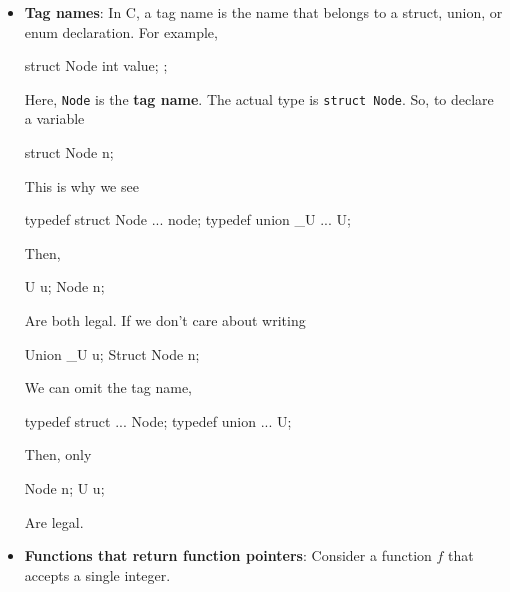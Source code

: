 \documentclass{report}
\begin{document}
    \pagebreak 
    \begin{itemize}
        \item \textbf{Tag names}: In C, a tag name is the name that belongs to a struct, union, or enum declaration. For example,
            \bigbreak \noindent 
            \begin{cppcode}
                struct Node {
                    int value;
                };
            \end{cppcode}
            \bigbreak \noindent 
            Here, \texttt{Node} is the \textbf{tag name}. The actual type is \texttt{struct Node}. So, to declare a variable
            \bigbreak \noindent 
            \begin{cppcode}
                struct Node n; 
            \end{cppcode}
            \bigbreak \noindent 
            This is why we see
            \bigbreak \noindent 
            \begin{cppcode}
                typedef struct Node {...} node;
                typedef union _U {...} U;
            \end{cppcode}
            \bigbreak \noindent 
            Then,
            \bigbreak \noindent 
            \begin{cppcode}
                U u;  
                Node n;
            \end{cppcode}
            \bigbreak \noindent 
            Are both legal. If we don't care about writing
            \bigbreak \noindent 
            \begin{cppcode}
                Union _U u;
                Struct Node n;
            \end{cppcode}
            \bigbreak \noindent 
            We can omit the tag name,
            \bigbreak \noindent 
            \begin{cppcode}
                typedef struct {...} Node;
                typedef union {...} U;
            \end{cppcode}
            \bigbreak \noindent 
            Then, only 
            \bigbreak \noindent 
            \begin{cppcode}
                Node n;
                U u;
            \end{cppcode}
            \bigbreak \noindent 
            Are legal.
        \item \textbf{Functions that return function pointers}: Consider a function $f$ that accepts a single integer.
            \bigbreak \noindent 

\end{itemize}
\end{document}
